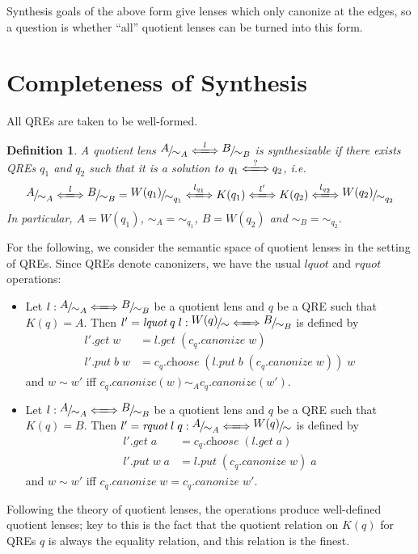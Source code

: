 \documentclass[a4paper,11pt] {article}
\theoremstyle{plain}
\newtheorem{definition}[theorem]{Definition}
\newcommand{\lget}[1]{\textit{$#1$.get}}
\newcommand{\lput}[1]{\textit{$#1$.put}}
\newcommand{\lquot}{\textit{lquot}}
\newcommand{\rquot}{\textit{rquot}}
\newcommand{\lcanonize}[1]{\textit{$#1$.canonize}}
\newcommand{\lchoose}[1]{\textit{$#1$.choose}}
\newcommand{\lensbetween}[1]{\xLongleftrightarrow{#1}}
\newcommand{\niceFrac}[2]{%
    \raise.5ex\hbox{$#1$}%
    \kern-.1em/\kern-.15em%
    \lower.25ex\hbox{$#2$}}
\begin{document}
Synthesis goals of the above form give lenses which only canonize at
the edges, so a question is whether ``all'' quotient lenses can be
turned into this form.


\section{Completeness of Synthesis}
All QREs are taken to be well-formed.
\begin{definition}
  A quotient lens
  $\niceFrac{A}{\sim_A} \lensbetween{l} \niceFrac{B}{\sim_B}$
  is synthesizable if there exists QREs $q_1$ and $q_2$ such that
  it is a solution to $q_1 \lensbetween{?} q_2$, i.e.
  \begin{align*}
    \niceFrac{A}{\sim_A} \lensbetween{l} \niceFrac{B}{\sim_B} =
    \niceFrac{W(q_1)}{\sim_{q_1}} \lensbetween{l_{q_1}} K(q_1)
    \lensbetween{l'}
    K(q_2) \lensbetween{l_{q_2}} \niceFrac{W(q_2)}{\sim_{q_2}}
  \end{align*}
  In particular, $A = W(q_1)$, $\sim_A {} = {} \sim_{q_1}$,
  $B = W(q_2)$ and $\sim_B {} = {} \sim_{q_2}$.
\end{definition}
For the following, we consider the semantic space of quotient
lenses in the setting of QREs.
Since QREs denote canonizers,
we have the usual $\lquot$ and $\rquot$ operations:
\begin{itemize}
\item Let $l: \niceFrac{A}{\sim_A} \lensbetween{}
  \niceFrac{B}{\sim_B}$ be a quotient lens and
  $q$ be a QRE such that $K(q) = A$.
  Then
  $l' = \lquot \; q \; l: \niceFrac{W(q)}{\sim} \lensbetween{}
  \niceFrac{B}{\sim_B}$
  is defined by
  \begin{align*}
    \lget{l'} \; w &= \lget{l} \; (\lcanonize{c_q} \; w) \\
    \lput{l'} \; b \; w &=
    \lchoose{c_q} \; (\lput{l} \; b \; (\lcanonize{c_q} \; w)) \; w
  \end{align*}
  and $w \sim w'$ iff $\lcanonize{c_q}(w) \sim_A \lcanonize{c_q}(w')$.
  
\item Let $l: \niceFrac{A}{\sim_A} \lensbetween{}
  \niceFrac{B}{\sim_B}$
  be a quotient lens and
  $q$ be a QRE such that $K(q) = B$.
  Then $l' = \rquot \; l \; q: \niceFrac{A}{\sim_A} \lensbetween{}
  \niceFrac{W(q)}{\sim}$
  is defined by
  \begin{align*}
    \lget{l'} \; a &= \lchoose{c_q} \; (\lget{l} \; a) \\
    \lput{l'} \; w \; a &= \lput{l} \; (\lcanonize{c_q} \; w) \; a
  \end{align*}
  and $w \sim w'$ iff $\lcanonize{c_q} \; w = \lcanonize{c_q} \; w'$.
\end{itemize}
Following the theory of quotient lenses, the operations produce
well-defined quotient lenses; key to this is the fact that the
quotient relation on $K(q)$ for QREs $q$ is always the equality
relation, and this relation is the finest.
\end{document}
